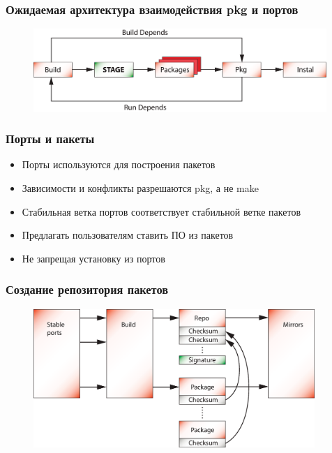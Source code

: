 \documentclass{beamer}
\begin{document}
\begin{frame}
\frametitle{Ожидаемая архитектура взаимодействия pkg и портов}
\begin{figure}[h!]
  \centering
  \includegraphics[width=0.99\textwidth]{q2.eps}
\end{figure}
\end{frame}

\begin{frame}
\frametitle{Порты и пакеты}
\begin{itemize}
  \item Порты используются для построения пакетов
  \item Зависимости и конфликты разрешаются pkg, а не make
  \item Стабильная ветка портов соответствует стабильной ветке пакетов
  \item Предлагать пользователям ставить ПО из пакетов
  \item Не запрещая установку из портов
\end{itemize} 
\end{frame}

\begin{frame}
\frametitle{Создание репозитория пакетов}
\begin{figure}[h!]
  \centering
  \includegraphics[width=0.95\textwidth]{q3.eps}
\end{figure}
\end{frame}
\end{document}
